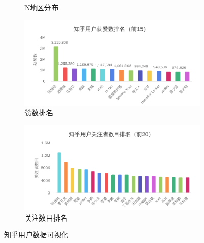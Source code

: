 \documentclass[bachelor,adobefonts]{jnuthesis}
\begin{document}
\begin{figure}[h!]
\begin{subfigure}[b]{0.49\linewidth}
    \caption{N地区分布}
  \end{subfigure}
  \begin{subfigure}[b]{0.49\linewidth}
    \centering
    \includegraphics[width=\linewidth]{Wyonghu-4.png}
    \caption{赞数排名}
  \end{subfigure}
  \begin{subfigure}[b]{0.49\linewidth}
    \centering
    \includegraphics[width=\linewidth]{Wyonghu-6.png}
    \caption{关注数目排名}
  \end{subfigure}
  \caption{知乎用户数据可视化}
\end{figure}




\end{document}
